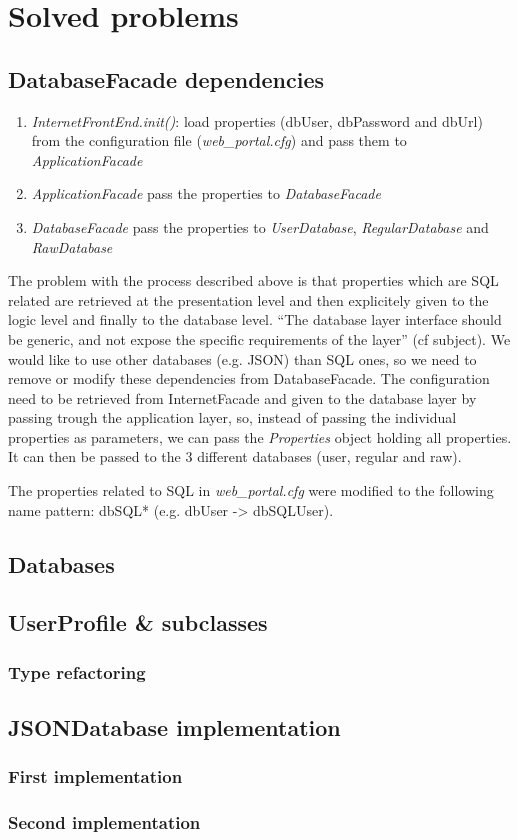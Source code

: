 \section{Solved problems}
\subsection{DatabaseFacade dependencies}

\begin{enumerate}
\item \emph{InternetFrontEnd.init()}: load properties (dbUser, dbPassword and
    dbUrl) from the configuration file (\emph{web\_portal.cfg}) and pass them to
    \emph{ApplicationFacade}
    
\item \emph{ApplicationFacade} pass the properties to \emph{DatabaseFacade}

\item \emph{DatabaseFacade} pass the properties to \emph{UserDatabase},
    \emph{RegularDatabase} and \emph{RawDatabase}
\end{enumerate}

The problem with the process described above is that properties which are SQL
related are retrieved at the presentation level and then explicitely given to
the logic level and finally to the database level. ``The database layer
interface should be generic, and not expose the specific requirements of the
layer'' (cf subject).
We would like to use other databases (e.g. JSON) than SQL ones, so we need to
remove or modify these dependencies from DatabaseFacade. The configuration need
to be retrieved from InternetFacade and given to the database layer by passing
trough the application layer, so, instead of passing the individual properties
as parameters, we can pass the \emph{Properties} object holding all properties.
It can then be passed to the 3 different databases (user, regular and raw).

The properties related to SQL in \emph{web\_portal.cfg} were modified to the
following name pattern: dbSQL* (e.g. dbUser -> dbSQLUser).

\subsection{Databases}

\subsection{UserProfile \& subclasses}

\subsubsection{Type refactoring}

\subsection{JSONDatabase implementation}

\subsubsection{First implementation}

\subsubsection{Second implementation}

\newpage

